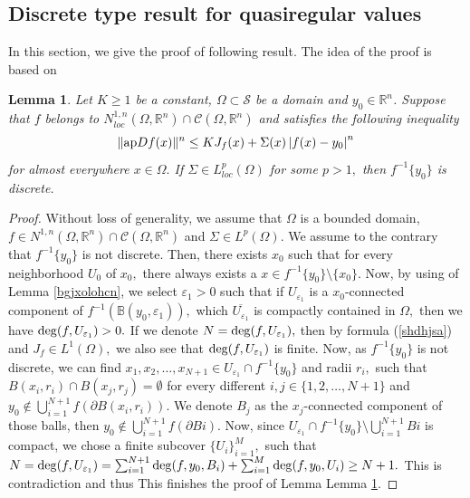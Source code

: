 \documentclass[11pt,twoside]{article}
\newtheorem{lem}[thm]{Lemma}
\theoremstyle{definition}
\theoremstyle{remark}
\newcommand{\abs}[1]{\left|#1\right|}
\begin{document}
\subsection{Discrete type result for quasiregular values} 
In this section, we give the proof of following result. The idea of the proof is based on  \cite{TS62,Kir14}
\begin{lem}\label{th11000dsvfffbvd}
Let $K\geq1$ be a constant, $\Omega\subset\mathcal{S}$ be a domain and $y_{0}\in\mathbb{R}^{n}$. Suppose that $f$ belongs to  $N_{loc}^{1,n}(\Omega,\mathbb{R}^{n})\cap \mathcal{C}(\Omega,\mathbb{R}^{n})$ and satisfies the following inequality
\begin{equation}
\| {\rm ap}Df(x)\|^{n}\leq KJ_{f}(x)+\Sigma(x)\abs{f(x)-y_{0}}^{n}
\end{equation}
for almost everywhere $x\in\Omega.$ If $\Sigma\in L_{loc}^{p}(\Omega)$ for some $p>1,$  then $f^{-1}\{y_{0}\}$ is discrete.
\end{lem}
\begin{proof}
Without loss of generality, we assume that $\Omega$ is a bounded domain, $f\in N^{1,n}(\Omega,\mathbb{R}^{n})\cap \mathcal{C}(\Omega,\mathbb{R}^{n})$ and $\Sigma\in L^{p}(\Omega).$
We assume to the contrary that  $f^{-1}\{y_{0}\}$ is not discrete. Then, there exists $x_{0}$ such that for every neighborhood $U_{0}$ of $x_{0},$ there always exists a $x\in f^{-1}\{y_{0}\}\setminus\{x_{0}\}.$
Now, by using of Lemma \ref{bgjxolohcn}, we select $\varepsilon_{1}>0$ such that if  $U_{\varepsilon_{1}}$ is a $x_{0}$-connected component of $f^{-1}(\mathbb{B}(y_{0},\varepsilon_{1})),$ which $\overline{U_{\varepsilon_{1}}}$ is compactly contained in $\Omega,$ then we have ${\rm deg}(f,U_{\varepsilon_{1}})>0.$  If we denote $N={\rm deg}(f,U_{\varepsilon_{1}}),$ then by formula (\ref{shdhjsa})
and  $J_{f}\in L^{1}(\Omega),$ we also see that ${\rm deg}(f,U_{\varepsilon_{1}})$ is finite. Now,  as  $f^{-1}\{y_{0}\}$ is not discrete,  we can find $x_{1},x_{2},\ldots,x_{N+1}\in U_{\varepsilon_{1}}\cap f^{-1}\{y_{0}\}$ and radii $r_{i},$ such that $B(x_{i},r_{i})\cap B(x_{j},r_{j})=\emptyset$ for every different $i,j\in\{1,2,\ldots,N+1\}$ and $y_{0}\notin\bigcup_{i=1}^{N+1}f(\partial B(x_{i},r_{i})).$
We denote $B_{j}$ as the $x_{j}$-connected component of those balls, then $y_{0}\notin\bigcup_{i=1}^{N+1}f(\partial B{i}).$ Now, since $U_{\varepsilon_{1}}\cap f^{-1}\{y_{0}\}\setminus\bigcup_{i=1}^{N+1}B{i}$
is compact, we chose a finite subcover $\{U_{i}\}_{i=1}^{M},$
such that $N={\rm deg}(f,U_{\varepsilon_{1}})=\sum_{i=1}^{N+1}{\rm deg}(f,y_{0},B_{i})+\sum_{i=1}^{M}{\rm deg}(f,y_{0},U_{i})\geq N+1.$ This is contradiction and thus This finishes the proof of Lemma
Lemma \ref{th11000dsvfffbvd}.
\end{proof}
\end{document}
